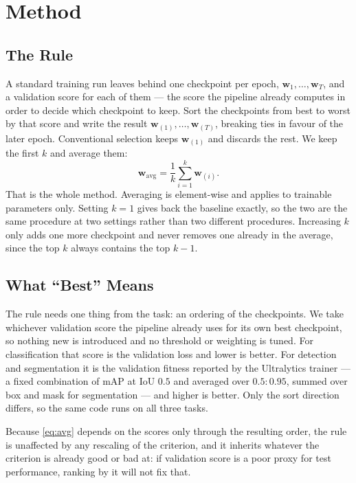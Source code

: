 \section{Method}
\label{sec:method}

\subsection{The Rule}

A standard training run leaves behind one checkpoint per epoch,
$\mathbf{w}_1,\dots,\mathbf{w}_T$, and a validation score for each of them ---
the score the pipeline already computes in order to decide which checkpoint to
keep. Sort the checkpoints from best to worst by that score and write the
result $\mathbf{w}_{(1)},\dots,\mathbf{w}_{(T)}$, breaking ties in favour of
the later epoch. Conventional selection keeps $\mathbf{w}_{(1)}$ and discards
the rest. We keep the first $k$ and average them:
\begin{equation}
  \mathbf{w}_{\text{avg}}=\frac{1}{k}\sum_{i=1}^{k}\mathbf{w}_{(i)} .
  \label{eq:avg}
\end{equation}
That is the whole method. Averaging is element-wise and applies to trainable
parameters only. Setting $k{=}1$ gives back the baseline exactly, so the two
are the same procedure at two settings rather than two different procedures.
Increasing $k$ only adds one more checkpoint and never removes one already in
the average, since the top $k$ always contains the top $k{-}1$.

\subsection{What ``Best'' Means}

The rule needs one thing from the task: an ordering of the checkpoints. We take
whichever validation score the pipeline already uses for its own best
checkpoint, so nothing new is introduced and no threshold or weighting is
tuned. For classification that score is the validation loss and lower is
better. For detection and segmentation it is the validation fitness reported by
the Ultralytics trainer \cite{jocher2023ultralytics} --- a fixed combination of
mAP at IoU $0.5$ and averaged over $0.5{:}0.95$, summed over box and mask for
segmentation --- and higher is better. Only the sort direction differs, so the
same code runs on all three tasks.

Because \cref{eq:avg} depends on the scores only through the resulting order,
the rule is unaffected by any rescaling of the criterion, and it inherits
whatever the criterion is already good or bad at: if validation score is a poor
proxy for test performance, ranking by it will not fix that.

